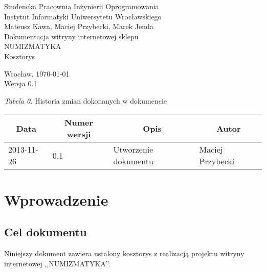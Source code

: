 \documentclass [11pt, a4paper, leqno]	{article}	%
\begin{document}

\begin{center}
	\thispagestyle{empty} 							%
	{\large Studencka Pracownia Inżynierii Oprogramowania} 		\\ [0.5cm]
	{\large Instytut Informatyki Uniwersytetu Wrocławskiego} 	\\ [6.0cm]

	{\large Mateusz Kawa, Maciej Przybecki, Marek Jenda} 		\\ [1.5cm]

	{\huge Dokumentacja witryny internetowej sklepu} 			\\ [0.5cm]
	{\huge NUMIZMATYKA} 										\\ [1.5cm]

	{\large Kosztorys} 										\\ [0.5cm]

	\vfill
	
	{\large Wrocław, \today}									\\ [0.5cm]
	{\large Wersja 0.1}
\end{center}

\newpage


\textit{Tabela 0.} Historia zmian dokonanych w dokumencie

\begin{center}
	\begin{tabular}{| l | l | l | l |}
		\hline
		\multicolumn{1}{|c|}{Data} & 
		\multicolumn{1}{|c|}{Numer wersji} &  
		\multicolumn{1}{|c|}{Opis} &
		\multicolumn{1}{|c|}{Autor} \\ \hline \hline
		2013-11-26 & 0.1 & Utworzenie dokumentu & Maciej Przybecki \\ \hline
	\end{tabular}
\end{center}
\newpage


\tableofcontents

\newpage

\section{Wprowadzenie}

\subsection{Cel dokumentu}
\noindent
Niniejszy dokument zawiera ustalony kosztorys z realizacją projektu witryny internetowej ,,NUMIZMATYKA''. \\
\end{document}

